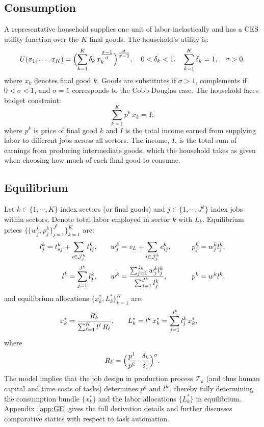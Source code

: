 \documentclass{article}
\theoremstyle{plain}
\theoremstyle{plain}
\begin{document}
\subsection{Consumption} 
\label{sec:household_GE}
A representative household supplies one unit of labor inelastically and has a CES utility function over the $K$ final goods.
The household's utility is:
\[
U(x_{1}, \ldots, x_{K}) = \Bigl(\sum_{k=1}^{K} \delta_k \,x_k^{\tfrac{\sigma - 1}{\sigma}}\Bigr)^{\tfrac{\sigma}{\sigma-1}},
\quad
0 < \delta_k < 1,
\quad
\sum_{k=1}^{K} \delta_k = 1,
\quad
\sigma > 0,
\]  
where $x_k$ denotes final good $k$.
Goods are substitutes if $ \sigma > 1$, complements if $0 < \sigma < 1$, and $\sigma = 1$ corresponds to the Cobb-Douglas case.  
The household faces budget constraint:  
\[
\sum_{k=1}^K p^k \,x_k = I,
\]  
where $p^k$ is price of final good $k$ and $I$ is the total income earned from supplying labor to different jobs across all sectors.  
The income, $I$, is the total sum of earnings from producing intermediate goods, which the household takes as given when choosing how much of each final good to consume.


\subsection{Equilibrium}
\label{sec:eq_GE}
Let $k \in \{1, \cdots, K\}$ index sectors (or final goods) and $j \in \{1,\cdots, J^k \}$ index jobs within sectors.
Denote total labor employed in sector $k$ with $L_k$.
Equilibrium prices $\big\{ \big\{ w_j^k, p_j^k \big\}_{j=1}^{J^k} \big\}_{k=1}^K$ are: 
\begin{align*}
l_{j}^k =  t_{sj}^k + \sum_{i \in \mathcal{J}_j^k} t_{ij}^{k},
& \qquad
w_j^k =  v_L + \sum_{i \in \mathcal{J}_j^k} c_{ij}^{k}, 
& \qquad
p_j^k = w_j^k l_{j}^k, \\
l_{}^k = \sum_{j=1}^{J^k} l_{j}^k,
& \qquad
w^k = \frac{\sum_{j=1}^{J_k} w_j^k l_{j}^k}{\sum_{j=1}^{J^k} l_{j}^k},
& \qquad
p^k = w^k l_{}^k,
\end{align*}
and equilibrium allocations $\big\{ x_k^*, L_k^* \big\}_{k=1}^K$ are:
\begin{align*}
x_k^* = \frac{R_k}{\sum_{\ell=1}^K l_{}^\ell\,R_\ell},
& \qquad
L_k^* = l_{}^k\,x_k^* = \sum_{j=1}^{J^k} l_{j}^k\,x_k^*,
\end{align*}
where
\[
R_k = \Bigl(\frac{p^1}{p^k} \cdot \frac{\delta_k}{\delta_1}\Bigr)^{\sigma}.
\]
The model implies that the job design in production process $\mathcal{T}_k$ (and thus human capital and time costs of tasks) determines $p^k$ and $l_{}^k$, thereby fully determining the consumption bundle $\{x_k^*\}$ and the labor allocations $\{L_k^*\}$ in equilibrium.
Appendix~\ref{app:GE} gives the full derivation details and further discusses comparative statics with respect to task automation.
\end{document}
